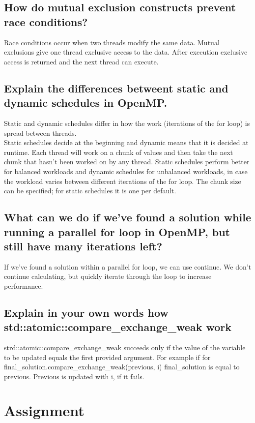 \documentclass[runningheads]{llncs}
\begin{document}
\subsection{How do mutual exclusion constructs prevent race conditions?}
Race conditions occur when two threads modify the same data. Mutual exclusions give one thread exclusive access to the data. 
After execution exclusive access is returned and the next thread can execute.

\subsection{Explain the differences betweent static and dynamic schedules in OpenMP.}
Static and dynamic schedules differ in how the work (iterations of the for loop) is spread between threads. 
\\
Static schedules decide at the beginning and dynamic means that it is decided at runtime. 
Each thread will work on a chunk of values and then take the next chunk that hasn't been worked on by any thread.
Static schedules perform better for balanced workloads and dynamic schedules for unbalanced workloads, 
in case the workload varies between different iterations of the for loop.
The chunk size can be specified; for static schedules it is one per default.

\subsection{What can we do if we've found a solution while running a parallel for loop in OpenMP, but still have many iterations left?}
If we've found a solution within a parallel for loop, we can use continue. We don't continue calculating, 
but quickly iterate through the loop to increase performance.


\subsection{Explain in your own words how std::atomic::compare\_exchange\_weak work}
strd::atomic::compare\_exchange\_weak  succeeds only if the value of the variable to be updated equals the first provided argument.
For example if for final\_solution.compare\_exchange\_weak(previous, i) final\_solution is equal to previous. 
Previous is updated with i, if it fails.

\section{Assignment}
\end{document}
